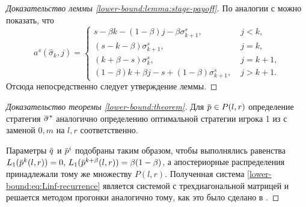 \documentclass[12pt, draft]{extarticle}
\newcommand{\overbar}[1]%
{\mkern 1.5mu\overline{\mkern-1.3mu#1\mkern-1.3mu}\mkern 1.3mu}
\newcommand{\p}{\ensuremath{\overbar{p}}}
\newcommand{\q}{\ensuremath{\overbar{q}}}
\newcommand{\sigmav}{\ensuremath{\overbar{\sigma}}}
\newcommand{\sigmak}{\ensuremath{\hat{\sigma}}}
\newcommand{\Low}[1][\ensuremath{\infty}]{\ensuremath{L_{#1}}}
\begin{document}
\begin{proof}[Доказательство леммы \ref{lower-bound:lemma:stage-payoff}]
  По аналогии с \cite{bib:pyanykh16} можно показать, что
  \begin{equation*}
    a^s(\sigmak_k, j) = \begin{cases}
      s - \beta k - (1-\beta) j - \beta \sigma^s_{k+1}, &\; j < k,\\
      (s - k - \beta) \sigma^s_{k+1}, &\; j = k,\\
      (k + \beta - s) \sigma^s_k, &\; j = k+1,\\
      (1-\beta) k + \beta j - s + (1-\beta) \sigma^s_{k+1}, &\; j > k + 1.
    \end{cases}
  \end{equation*}
  Отсюда непосредственно следует утверждение леммы.
\end{proof}

\begin{proof}[Доказательство теоремы \ref{lower-bound:theorem}]
  Для $\p \in P(l,r)$ определение стратегия $\sigmav^*$ аналогично определению
  оптимальной стратегии игрока 1 из \cite{bib:pyanykh16} с заменой $0, m$ на $l,
  r$ соответственно.

  Параметры $\q$ и $\p^i$ подобраны таким образом, чтобы выполнялись равенства %
  $\Low[1](\p^k(l,r)) = 0, \, \Low[1](\p^{k+\beta}(l,r)) = \beta(1-\beta)$, а
  апостериорные распределения принадлежали тому же множеству $P(l,r)$.
  Полученная система \eqref{lower-bound:eq:Linf-recurrence} является системой с
  трехдиагональной матрицей и решается методом прогонки аналогично тому, как это
  было сделано в \cite{bib:pyanykh16}.
\end{proof}
\end{document}
